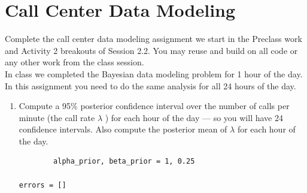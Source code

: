 \documentclass[11pt]{report}
\begin{document}
\section*{Call Center Data Modeling}
Complete the call center data modeling assignment we start in the Pre­class work and Activity 2
breakouts of Session 2.2. You may re­use and build on all code or any other work from the class
session.\\ 

In class we completed the Bayesian data modeling problem for 1 hour of the day. In this
assignment you need to do the same analysis for all 24 hours of the day.

\begin{enumerate}
	\item Compute a 95\% posterior confidence interval over the number of calls per minute (the call rate $\lambda$ ) for each hour of the day — so you will have 24 confidence intervals. Also compute the posterior mean of $\lambda$ for each hour of the day.
	\begin{verbatim}
		alpha_prior, beta_prior = 1, 0.25

errors = []


\end{verbatim}
\end{enumerate}
\end{document}
